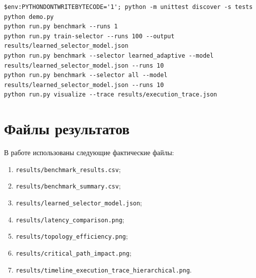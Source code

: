 \documentclass[12pt,a4paper]{report}
\newcommand{\code}[1]{\texttt{#1}}
\begin{document}
\begin{lstlisting}
$env:PYTHONDONTWRITEBYTECODE='1'; python -m unittest discover -s tests
python demo.py
python run.py benchmark --runs 1
python run.py train-selector --runs 100 --output results/learned_selector_model.json
python run.py benchmark --selector learned_adaptive --model results/learned_selector_model.json --runs 10
python run.py benchmark --selector all --model results/learned_selector_model.json --runs 10
python run.py visualize --trace results/execution_trace.json
\end{lstlisting}

\chapter{Файлы результатов}

В работе использованы следующие фактические файлы:
\begin{enumerate}
  \item \code{results/benchmark\_results.csv};
  \item \code{results/benchmark\_summary.csv};
  \item \code{results/learned\_selector\_model.json};
  \item \code{results/latency\_comparison.png};
  \item \code{results/topology\_efficiency.png};
  \item \code{results/critical\_path\_impact.png};
  \item \code{results/timeline\_execution\_trace\_hierarchical.png}.
\end{enumerate}



\end{document}
